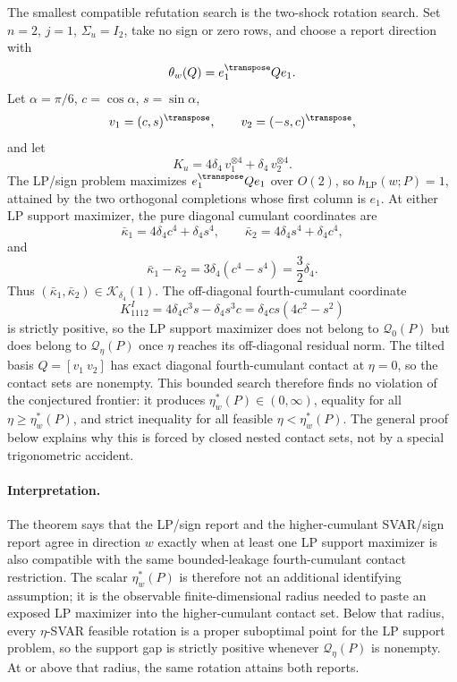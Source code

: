 The smallest compatible refutation search is the two-shock rotation search.  Set \(n=2\), \(j=1\), \(\Sigma_u=I_2\), take no sign or zero rows, and choose a report direction with
\[
\theta_w(Q)=e_1^\transpose Qe_1 .
\]
Let \(\alpha=\pi/6\), \(c=\cos\alpha\), \(s=\sin\alpha\),
\[
v_1=(c,s)^\transpose,\qquad v_2=(-s,c)^\transpose,
\]
and let
\[
K_u=4\delta_4\,v_1^{\otimes4}+\delta_4\,v_2^{\otimes4}.
\]
The LP/sign problem maximizes \(e_1^\transpose Qe_1\) over \(O(2)\), so \(h_{\mathrm{LP}}(w;P)=1\), attained by the two orthogonal completions whose first column is \(e_1\).  At either LP support maximizer, the pure diagonal cumulant coordinates are
\[
\bar\kappa_1=4\delta_4c^4+\delta_4s^4,\qquad
\bar\kappa_2=4\delta_4s^4+\delta_4c^4,
\]
and
\[
\bar\kappa_1-\bar\kappa_2
=3\delta_4(c^4-s^4)
=\frac{3}{2}\delta_4 .
\]
Thus \((\bar\kappa_1,\bar\kappa_2)\in\mathcal K_{\delta_4}(1)\).  The off-diagonal fourth-cumulant coordinate
\[
K^I_{1112}
=4\delta_4c^3s-\delta_4s^3c
=\delta_4cs(4c^2-s^2)
\]
is strictly positive, so the LP support maximizer does not belong to \(\mathcal Q_0(P)\) but does belong to \(\mathcal Q_\eta(P)\) once \(\eta\) reaches its off-diagonal residual norm.  The tilted basis \(Q=[v_1\ v_2]\) has exact diagonal fourth-cumulant contact at \(\eta=0\), so the contact sets are nonempty.  This bounded search therefore finds no violation of the conjectured frontier: it produces \(\eta_w^*(P)\in(0,\infty)\), equality for all \(\eta\ge\eta_w^*(P)\), and strict inequality for all feasible \(\eta<\eta_w^*(P)\).  The general proof below explains why this is forced by closed nested contact sets, not by a special trigonometric accident.

\paragraph{Interpretation.}
The theorem says that the LP/sign report and the higher-cumulant SVAR/sign report agree in direction \(w\) exactly when at least one LP support maximizer is also compatible with the same bounded-leakage fourth-cumulant contact restriction.  The scalar \(\eta_w^*(P)\) is therefore not an additional identifying assumption; it is the observable finite-dimensional radius needed to paste an exposed LP maximizer into the higher-cumulant contact set.  Below that radius, every \(\eta\)-SVAR feasible rotation is a proper suboptimal point for the LP support problem, so the support gap is strictly positive whenever \(\mathcal Q_\eta(P)\) is nonempty.  At or above that radius, the same rotation attains both reports.

